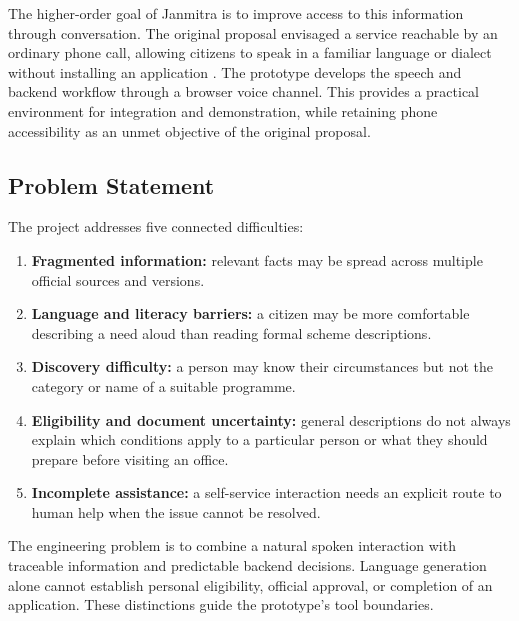 \documentclass[11pt,a4paper,oneside]{report}
\begin{document}
The higher-order goal of Janmitra is to improve access to this information through
conversation. The original proposal envisaged a service reachable by an ordinary
phone call, allowing citizens to speak in a familiar language or dialect without
installing an application \cite{proposal}. The prototype develops the speech and
backend workflow through a browser voice channel. This provides a practical
environment for integration and demonstration, while retaining phone accessibility
as an unmet objective of the original proposal.

\subsection{Problem Statement}
The project addresses five connected difficulties:
\begin{enumerate}
  \item \textbf{Fragmented information:} relevant facts may be spread across
    multiple official sources and versions.
  \item \textbf{Language and literacy barriers:} a citizen may be more comfortable
    describing a need aloud than reading formal scheme descriptions.
  \item \textbf{Discovery difficulty:} a person may know their circumstances but
    not the category or name of a suitable programme.
  \item \textbf{Eligibility and document uncertainty:} general descriptions do not
    always explain which conditions apply to a particular person or what they
    should prepare before visiting an office.
  \item \textbf{Incomplete assistance:} a self-service interaction needs an
    explicit route to human help when the issue cannot be resolved.
\end{enumerate}

The engineering problem is to combine a natural spoken interaction with
traceable information and predictable backend decisions. Language generation
alone cannot establish personal eligibility, official approval, or completion
of an application. These distinctions guide the prototype's tool boundaries.
\end{document}
